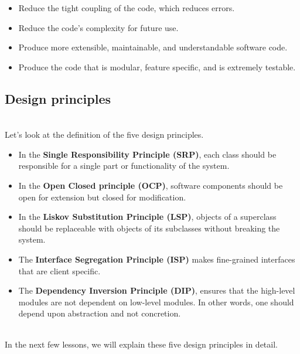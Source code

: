\begin{itemize}
\item
Reduce the tight coupling of the code, which reduces errors.
\item
Reduce the code's complexity for future use.
\item
Produce more extensible, maintainable, and understandable software code.
\item
Produce the code that is modular, feature specific, and is extremely testable.
\end{itemize}

\subsection{Design principles}\label{design-principles}
\\
Let's look at the definition of the five design principles.

\begin{itemize}
\item
In the \textbf{Single Responsibility Principle (SRP)}, each class should be responsible for a single part or functionality of the system.
\item
In the \textbf{Open Closed principle (OCP)}, software components should be open for extension but closed for modification.
\item
In the \textbf{Liskov Substitution Principle (LSP)}, objects of a superclass should be replaceable with objects of its subclasses without breaking the system.
\item
The \textbf{Interface Segregation Principle (ISP)} makes fine-grained interfaces that are client specific.
\item
The \textbf{Dependency Inversion Principle (DIP)}, ensures that the high-level modules are not dependent on low-level modules. In other words, one should depend upon abstraction and not concretion.
\end{itemize}
\\
In the next few lessons, we will explain these five design principles in detail.

